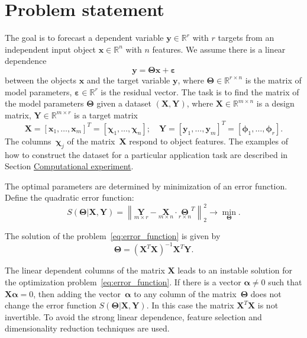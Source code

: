 \documentclass[12pt,twoside]{article}
\newcommand{\bx}{\mathbf{x}}
\newcommand{\by}{\mathbf{y}}
\newcommand{\bY}{\mathbf{Y}}
\newcommand{\bX}{\mathbf{X}}
\newcommand{\bbR}{\mathbb{R}}
\newcommand{\bchi}{\boldsymbol{\chi}}
\newcommand{\bphi}{\boldsymbol{\phi}}
\newcommand{\bTheta}{\boldsymbol{\Theta}}
\begin{document}
\linenumbers
\section{Problem statement}

The goal is to forecast a dependent variable $\by \in \bbR^r$ with $r$ targets from an independent input object $\bx \in \bbR^n$ with $n$ features.
We assume there is a linear dependence 
\begin{equation}
	\by = \bTheta \bx+ \boldsymbol{\varepsilon}
	\label{eq:model}
\end{equation}
between the objects $\bx$ and the target variable $\by$,
where $\bTheta \in \bbR^{r \times n}$ is the matrix of model parameters, $\boldsymbol{\varepsilon} \in \bbR^{r}$ is the residual vector.
The task is to find the matrix of the model parameters $\bTheta$ given a dataset $\left( \bX, \bY \right)$, where $\bX \in \bbR^{m \times n}$ is a design matrix, $\bY \in \bbR^{m \times r}$ is a target matrix
\[
	\bX = [\bx_1, \dots, \bx_m]^{T} =  [\bchi_1, \dots, \bchi_n]; \quad \bY = [\by_1, \dots, \by_m]^{T} =  [\bphi_1, \dots, \bphi_r].
\]
The columns~$\bchi_j$ of the matrix~$\bX$ respond to object features. 
The examples of how to construct the dataset for a particular application task are described in Section \hyperref[sec:exper]{Computational experiment}.

The optimal parameters are determined by minimization of an error function. 
Define the quadratic error function:
\begin{equation}
	S(\bTheta | \bX, \bY) = {\left\| \underset{m \times r}{\mathbf{Y}}  - \underset{m \times n}{\bX} \cdot \underset{r \times n}{\bTheta}^T \right\| }_2^2 \rightarrow\min_{\bTheta}.
\label{eq:error_function}
\end{equation}
 
 The solution of the problem~\eqref{eq:error_function} is given by
 \[
 	\bTheta = (\bX^{T} \bX)^{-1} \bX^{T} \bY.
 \]
 
 The linear dependent columns of the matrix $\bX$ leads to an instable solution for the optimization problem~\eqref{eq:error_function}. 
 If there is a vector $\boldsymbol{\alpha} \neq 0$ such that $\bX \boldsymbol{\alpha}= 0$, then adding the vector~$\boldsymbol{\alpha}$ to any column of the matrix~$\bTheta$ does not change the error function $S(\bTheta | \bX, \bY)$.
 In this case the matrix $\bX^{T} \bX$ is not invertible.
 To avoid the strong linear dependence, feature selection and dimensionality reduction techniques are used.
 
\end{document}
